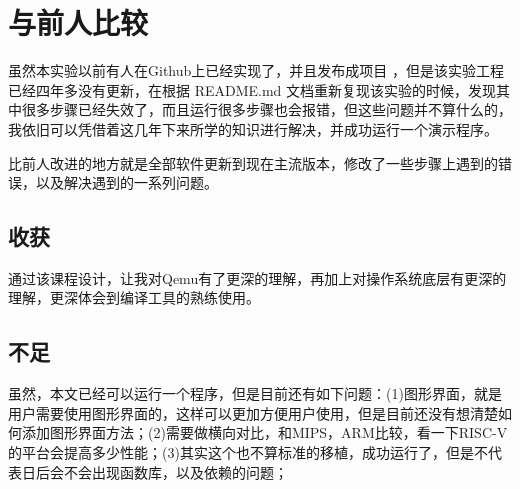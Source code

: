 \section{与前人比较}
虽然本实验以前有人在Github上已经实现了，并且发布成项目 \cite{BusyBear} ，但是该实验工程已经四年多没有更新，在根据 README.md 文档重新复现该实验的时候，发现其中很多步骤已经失效了，而且运行很多步骤也会报错，但这些问题并不算什么的，我依旧可以凭借着这几年下来所学的知识进行解决，并成功运行一个演示程序。

比前人改进的地方就是全部软件更新到现在主流版本，修改了一些步骤上遇到的错误，以及解决遇到的一系列问题。

\subsection{收获}
通过该课程设计，让我对Qemu有了更深的理解，再加上对操作系统底层有更深的理解，更深体会到编译工具的熟练使用。

\subsection{不足}
虽然，本文已经可以运行一个程序，但是目前还有如下问题：(1)图形界面，就是用户需要使用图形界面的，这样可以更加方便用户使用，但是目前还没有想清楚如何添加图形界面方法；(2)需要做横向对比，和MIPS，ARM比较，看一下RISC-V的平台会提高多少性能；(3)其实这个也不算标准的移植，成功运行了，但是不代表日后会不会出现函数库，以及依赖的问题；

